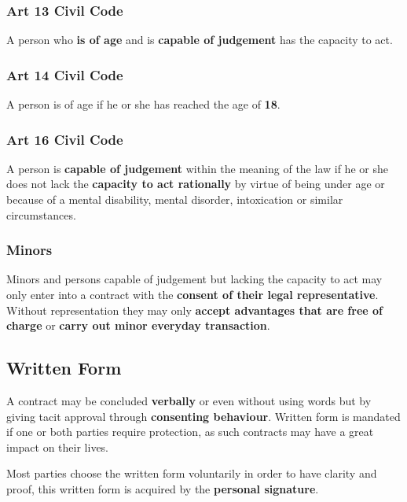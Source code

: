 \documentclass[11pt]{article}
\theoremstyle{definition}
\begin{document}
\subsubsection{Art 13 Civil Code}
A person who \textbf{is of age} and is \textbf{capable of judgement} has the capacity to act.

\subsubsection{Art 14 Civil Code}
A person is of age if he or she has reached the age of \textbf{18}.

\subsubsection{Art 16 Civil Code}
A person is \textbf{capable of judgement} within the meaning of the law if he or she does not lack the \textbf{capacity to act rationally} by virtue of being under age or because of a mental disability, mental disorder, intoxication or similar circumstances.

\subsubsection{Minors}
Minors and persons capable of judgement but lacking the capacity to act may only enter into a contract with the \textbf{consent of their legal representative}. Without representation they may only \textbf{accept advantages that are free of charge} or \textbf{carry out minor everyday transaction}.

\subsection{Written Form}
A contract may be concluded \textbf{verbally} or even without using words but by giving tacit approval through \textbf{consenting behaviour}. Written form is mandated if one or both parties require protection, as such contracts may have a great impact on their lives.

Most parties choose the written form voluntarily in order to have clarity and proof, this written form is acquired by the \textbf{personal signature}.
\end{document}
